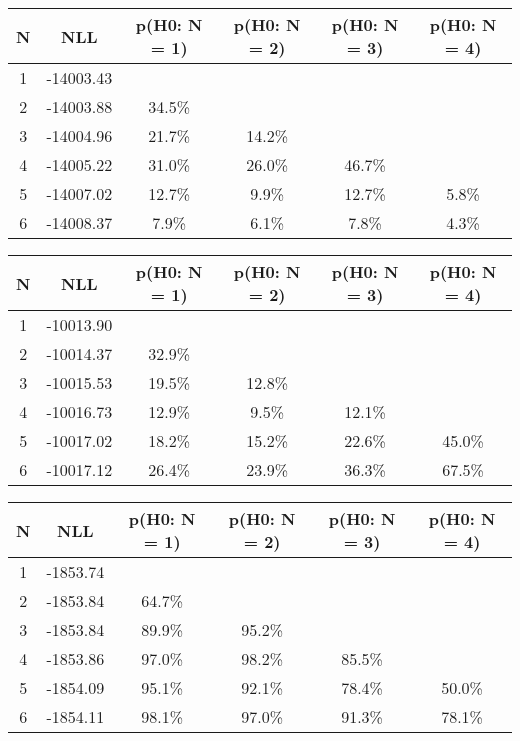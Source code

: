 \begin{table}[htb]
	\begin{center}
{\footnotesize\renewcommand{\arraystretch}{1.4}
		\begin{tabular}{cc||cccc}
			N & NLL & p(H0: N = 1) & p(H0: N = 2) & p(H0: N = 3) & p(H0: N = 4)\\ 
		\hline
1 & -14003.43 & & & & \\
2 & -14003.88 & 34.5\% & & & \\
3 & -14004.96 & 21.7\% & 14.2\% & & \\
4 & -14005.22 & 31.0\% & 26.0\% & 46.7\% & \\
5 & -14007.02 & 12.7\% & 9.9\% & 12.7\% & 5.8\% \\
6 & -14008.37 & 7.9\% & 6.1\% & 7.8\% & 4.3\% \\
	\end{tabular}
		\label{tab:lab}
	}
	\end{center}\end{table}

\begin{table}[htb]
	\begin{center}
{\footnotesize\renewcommand{\arraystretch}{1.4}
		\begin{tabular}{cc||cccc}
			N & NLL & p(H0: N = 1) & p(H0: N = 2) & p(H0: N = 3) & p(H0: N = 4)\\ 
		\hline
1 & -10013.90 & & & & \\
2 & -10014.37 & 32.9\% & & & \\
3 & -10015.53 & 19.5\% & 12.8\% & & \\
4 & -10016.73 & 12.9\% & 9.5\% & 12.1\% & \\
5 & -10017.02 & 18.2\% & 15.2\% & 22.6\% & 45.0\% \\
6 & -10017.12 & 26.4\% & 23.9\% & 36.3\% & 67.5\% \\
	\end{tabular}
		\label{tab:lab}
	}
	\end{center}\end{table}

\begin{table}[htb]
	\begin{center}
{\footnotesize\renewcommand{\arraystretch}{1.4}
		\begin{tabular}{cc||cccc}
			N & NLL & p(H0: N = 1) & p(H0: N = 2) & p(H0: N = 3) & p(H0: N = 4)\\ 
		\hline
1 & -1853.74 & & & & \\
2 & -1853.84 & 64.7\% & & & \\
3 & -1853.84 & 89.9\% & 95.2\% & & \\
4 & -1853.86 & 97.0\% & 98.2\% & 85.5\% & \\
5 & -1854.09 & 95.1\% & 92.1\% & 78.4\% & 50.0\% \\
6 & -1854.11 & 98.1\% & 97.0\% & 91.3\% & 78.1\% \\
	\end{tabular}
		\label{tab:lab}
	}
	\end{center}\end{table}

